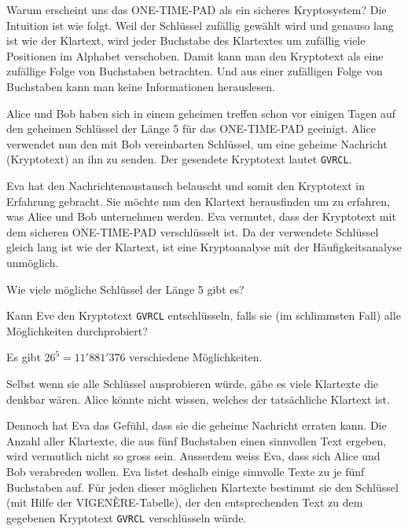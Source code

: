 Warum erscheint uns das ONE-TIME-PAD als ein sicheres Kryptosystem? Die Intuition ist
wie folgt. Weil der Schlüssel zufällig gewählt wird und genauso lang ist wie der Klartext,
wird jeder Buchstabe des Klartextes um zufällig viele Positionen im Alphabet verschoben.
Damit kann man den Kryptotext als eine zufällige Folge von Buchstaben betrachten. Und
aus einer zufälligen Folge von Buchstaben kann man keine Informationen herauslesen.

Alice und Bob haben sich in einem geheimen treffen schon vor einigen Tagen auf den geheimen Schlüssel der Länge 5 für das ONE-TIME-PAD geeinigt. Alice verwendet nun den mit Bob vereinbarten Schlüssel, um eine geheime Nachricht (Kryptotext) an ihn zu senden. Der gesendete Kryptotext lautet \verb|GVRCL|.

Eva hat den Nachrichtenaustausch belauscht und somit den Kryptotext in Erfahrung
gebracht. Sie möchte nun den Klartext herausfinden um zu erfahren, was Alice und Bob
unternehmen werden. Eva vermutet, dass der Kryptotext mit dem sicheren ONE-TIME-PAD verschlüsselt ist. Da der verwendete Schlüssel gleich lang ist wie der Klartext, ist eine Kryptoanalyse mit der Häufigkeitsanalyse unmöglich.

\begin{myexercise}
	\begin{aenum}
		\item Wie viele mögliche Schlüssel der Länge 5 gibt es?
		\item Kann Eve den Kryptotext \verb|GVRCL| entschlüsseln, falls sie (im schlimmsten Fall) alle Möglichkeiten durchprobiert?
	\end{aenum}
	\begin{myanswer}
		\begin{aenum}
			\item Es gibt $26^5 = 11'881'376$ verschiedene Möglichkeiten.
			\item Selbst wenn sie alle Schlüssel ausprobieren würde, gäbe es viele Klartexte die denkbar wären. Alice könnte nicht wissen, welches der tatsächliche Klartext ist.
		\end{aenum}
	\end{myanswer}
\end{myexercise}
Dennoch hat Eva das Gefühl, dass sie die geheime Nachricht erraten kann.
Die Anzahl aller Klartexte, die aus fünf Buchstaben einen sinnvollen Text ergeben, wird
vermutlich nicht so gross sein. Ausserdem weiss Eva, dass sich Alice und Bob verabreden
wollen. Eva listet deshalb einige sinnvolle Texte zu je fünf Buchstaben auf. Für jeden dieser
möglichen Klartexte bestimmt sie den Schlüssel (mit Hilfe der VIGENÈRE-Tabelle), der den entsprechenden Text zu dem
gegebenen Kryptotext \verb|GVRCL| verschlüsseln würde.

